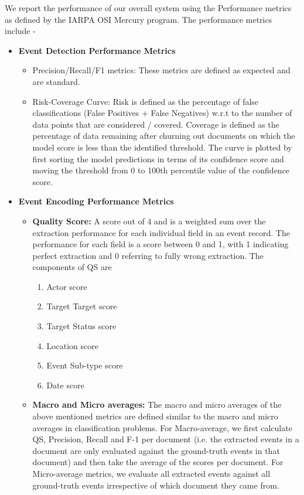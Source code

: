 We report the performance of our overall system using the Performance metrics as defined by the IARPA OSI Mercury program. The performance metrics include -  
\begin{itemize}
    \item \textbf{Event Detection Performance Metrics}
    \begin{itemize}
        \item Precision/Recall/F1 metrics: These metrics are defined as expected and are standard.
\item Risk-Coverage Curve: Risk is defined as the percentage of false classifications (False Positives + False Negatives) w.r.t to the number of data points that are considered / covered. Coverage is defined as the percentage of data remaining after churning out documents on which the model score is less than the identified threshold. The curve is plotted by first sorting the model predictions in terms of its confidence score and moving the threshold from 0 to 100th percentile value of the confidence score. 
    \end{itemize}

\item \textbf{Event Encoding Performance Metrics}
    \begin{itemize}
        \item \textbf{Quality Score:} A score out of 4 and is a weighted sum over the extraction performance for each individual field in an event record. The performance for each field is a score between 0 and 1, with 1 indicating perfect extraction and 0 referring to fully wrong extraction. The components of QS are  
            \begin{enumerate}
                \item Actor score
                \item Target Target score
                \item Target Status score
                \item Location score
                \item Event Sub-type score
                \item Date score
            \end{enumerate}

         \item \textbf{Macro and Micro averages:} The macro and micro averages of the 
    above mentioned metrics are defined similar to the macro and micro averages in classification problems. For Macro-average, we first calculate QS, Precision, Recall and F-1 per document (i.e. the extracted events in a document are only evaluated against the ground-truth events in that document) and then take the average of the scores per document. 
    For Micro-average metrics, we evaluate all extracted events against all ground-truth events irrespective of which document they came from.
    \end{itemize}
\end{itemize}

